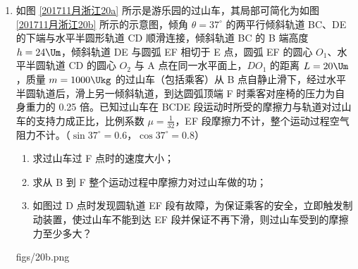 \documentclass[\gkver]{gaokaozhenti}
\begin{document}
\begin{enumerate}
{	（2）滑块在 MB 段的加速度为 $a_2$，由牛顿第二定律得

	$a_2=\frac{\mu(mg-qE)}{m}=0.7\Umsq$，

	由运动学公式得

	$\frac{L}{2}=v_Mt_1-\frac{1}{2}a_2t_1^{2}$，解得 $t_1=\frac{10}{7}\Us$。

	（3）滑块下落时间为 $t_2=\sqrt{\frac{2h}{g}}=0.5\Us$，

	由运动学公式得

	$v_B=v_M-a_2t_1=3\Ums$，

	$x=v_Bt_2=1.5\Um$。
}

\item
如图 \ref{201711月浙江20a} 所示是游乐园的过山车，其局部可简化为如图 \ref{201711月浙江20b} 所示的示意图，倾角 $\theta=37^\circ$ 的两平行倾斜轨道 BC、DE 的下端与水平半圆形轨道 CD 顺滑连接，倾斜轨道 BC 的 B 端高度 $h=24\Um$，倾斜轨道 DE 与圆弧 EF 相切于 E 点，圆弧 EF 的圆心 $O_1$、水平半圆轨道 CD 的圆心 $O_2$ 与 A 点在同一水平面上，$DO_1$ 的距离 $L=20\Um$，质量 $m=1000\Ukg$ 的过山车（包括乘客）从 B 点自静止滑下，经过水平半圆轨道后，滑上另一倾斜轨道，到达圆弧顶端 F 时乘客对座椅的压力为自身重力的 0.25 倍。已知过山车在 BCDE 段运动时所受的摩擦力与轨道对过山车的支持力成正比，比例系数 $\mu=\frac{1}{32}$，EF 段摩擦力不计，整个运动过程空气阻力不计。（$\sin37^\circ=0.6$，$\cos37^\circ=0.8$）
\begin{enumerate}
	\item
	求过山车过 F 点时的速度大小；
	\item
	求从 B 到 F 整个运动过程中摩擦力对过山车做的功；
	\item
	如图过 D 点时发现圆轨道 EF 段有故障，为保证乘客的安全，立即触发制动装置，使过山车不能到达 EF 段并保证不再下滑，则过山车受到的摩擦力至少多大？
\end{enumerate}

{figs/20b.png}
\end{enumerate}
\end{document}
